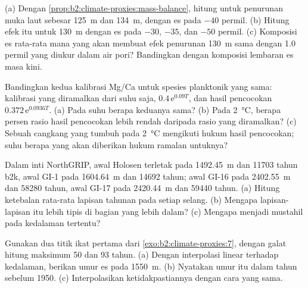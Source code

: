 \begin{exercise}[$\star\star$]\label{exo:b2:climate-proxies:5}
(a) Dengan \cref{prop:b2:climate-proxies:mass-balance}, hitung  untuk penurunan muka laut
sebesar \qty{125}{m} dan \qty{134}{m}, dengan es pada $-40$ permil. (b) Hitung efek itu untuk
\qty{130}{m} dengan es pada $-30$, $-35$, dan $-50$ permil. (c) Komposisi es rata-rata mana
yang akan membuat efek penurunan \qty{130}{m} sama dengan \num{1.0} permil yang diukur dalam air
pori? Bandingkan dengan komposisi lembaran es masa kini.
\end{exercise}

\begin{exercise}[$\star\star$]\label{exo:b2:climate-proxies:6}
Bandingkan kedua kalibrasi Mg/Ca untuk spesies planktonik yang sama: kalibrasi yang diramalkan dari
suhu saja, $0.4\,\mathrm{e}^{0.09T}$, dan hasil pencocokan $0.372\,\mathrm{e}^{0.0936T}$. (a) Pada
suhu berapa keduanya sama? (b) Pada \qty{2}{\celsius}, berapa persen rasio hasil pencocokan
lebih rendah daripada rasio yang diramalkan? (c) Sebuah cangkang yang tumbuh pada \qty{2}{\celsius} mengikuti hukum hasil pencocokan; suhu
berapa yang akan diberikan hukum ramalan untuknya?
\end{exercise}

\begin{exercise}[$\star\star$]\label{exo:b2:climate-proxies:7}
Dalam inti NorthGRIP, awal Holosen terletak pada \qty{1492.45}{m} dan \num{11703} tahun
b2k, awal GI-1 pada \qty{1604.64}{m} dan \num{14692} tahun; awal GI-16 pada
\qty{2402.55}{m} dan \num{58280} tahun, awal GI-17 pada \qty{2420.44}{m} dan \num{59440} tahun.
(a) Hitung ketebalan rata-rata lapisan tahunan pada setiap selang. (b) Mengapa lapisan-lapisan itu lebih tipis
di bagian yang lebih dalam? (c) Mengapa  menjadi mustahil pada kedalaman tertentu?
\end{exercise}

\begin{exercise}[$\star\star$]\label{exo:b2:climate-proxies:8}
Gunakan dua titik ikat pertama dari \cref{exo:b2:climate-proxies:7}, dengan galat hitung maksimum 50
dan 93 tahun. (a) Dengan interpolasi linear terhadap kedalaman, berikan umur es pada \qty{1550}{m}.
(b) Nyatakan umur itu dalam tahun sebelum 1950. (c) Interpolasikan ketidakpastiannya dengan cara yang sama.
\end{exercise}

